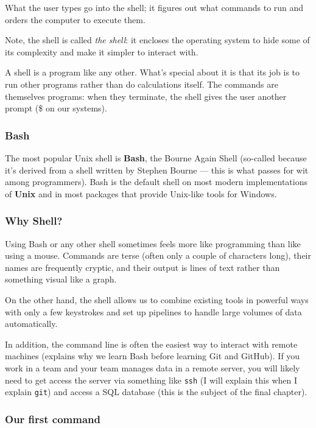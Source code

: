 \documentclass[
]{book}
\begin{document}
What the user types go into the shell; it figures out what commands to run and orders the computer to execute them.

Note, the shell is called \emph{the shell}: it encloses the operating system to hide some of its complexity and make it simpler to interact with.

A shell is a program like any other. What's special about it is that its job is to run other programs rather than do calculations itself. The commands are themselves programs: when they terminate, the shell gives the user another prompt (\$ on our systems).

\hypertarget{bash}{%
\subsubsection{Bash}\label{bash}}

The most popular Unix shell is \textbf{Bash}, the Bourne Again Shell (so-called because it's derived from a shell written by Stephen Bourne --- this is what passes for wit among programmers). Bash is the default shell on most modern implementations of \textbf{Unix} and in most packages that provide Unix-like tools for Windows.

\hypertarget{why-shell}{%
\subsubsection{Why Shell?}\label{why-shell}}

Using Bash or any other shell sometimes feels more like programming than like using a mouse. Commands are terse (often only a couple of characters long), their names are frequently cryptic, and their output is lines of text rather than something visual like a graph.

On the other hand, the shell allows us to combine existing tools in powerful ways with only a few keystrokes and set up pipelines to handle large volumes of data automatically.

In addition, the command line is often the easiest way to interact with remote machines (explains why we learn Bash before learning Git and GitHub). If you work in a team and your team manages data in a remote server, you will likely need to get access the server via something like \texttt{ssh} (I will explain this when I explain \texttt{git}) and access a SQL database (this is the subject of the final chapter).

\hypertarget{our-first-command}{%
\subsubsection{Our first command}\label{our-first-command}}
\end{document}
